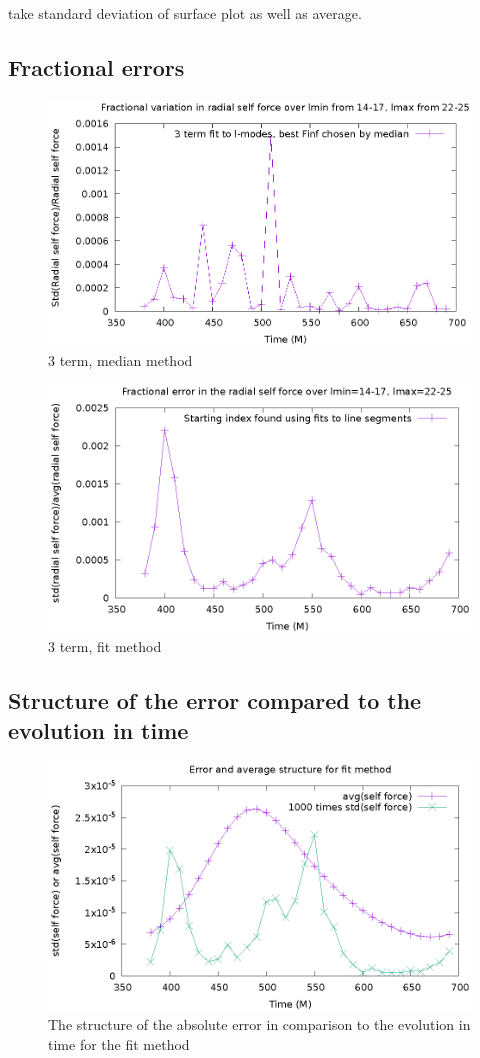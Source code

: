 take standard deviation of surface plot as well as average.


\subsection{Fractional errors}
\begin{figure}
  \includegraphics{fractionalErrorSelfForceOverTime3termMedian}
  \caption{3 term, median method}
\end{figure}

\begin{figure}
  \includegraphics{fractionalErrorOverTimeFits}
  \caption{3 term, fit method}
\end{figure}

\subsection{Structure of the error compared to the evolution in time}
\begin{figure}
  \includegraphics{structErrFitMethod}
  \caption{The structure of the absolute error in comparison to the evolution in time for the fit method}
\end{figure}





